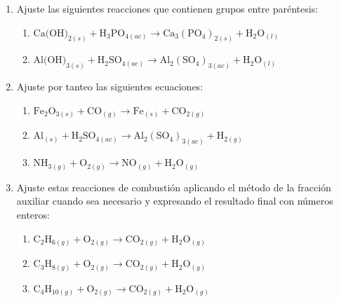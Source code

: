 \documentclass[12pt, letterpaper]{article}
\begin{document}
\begin{enumerate}[leftmargin=*, start=1]
  \item \medio{}\hspace{0.55em}Ajuste las siguientes reacciones que contienen grupos entre paréntesis:
        \begin{enumerate}[label=\alph*), leftmargin=1.8em, nosep, topsep=2pt]
          \item $\text{Ca(OH)}_{2(s)} + \text{H}_3\text{PO}_{4(ac)} \longrightarrow \text{Ca}_3(\text{PO}_4)_{2(s)} + \text{H}_2\text{O}_{(l)}$
          \item $\text{Al(OH)}_{3(s)} + \text{H}_2\text{SO}_{4(ac)} \longrightarrow \text{Al}_2(\text{SO}_4)_{3(ac)} + \text{H}_2\text{O}_{(l)}$
        \end{enumerate}

  \item \medio{}\hspace{0.55em}Ajuste por tanteo las siguientes ecuaciones:
        \begin{enumerate}[label=\alph*), leftmargin=1.8em, nosep, topsep=2pt]
          \item $\text{Fe}_2\text{O}_{3(s)} + \text{CO}_{(g)} \longrightarrow \text{Fe}_{(s)} + \text{CO}_{2(g)}$
          \item $\text{Al}_{(s)} + \text{H}_2\text{SO}_{4(ac)} \longrightarrow \text{Al}_2(\text{SO}_4)_{3(ac)} + \text{H}_{2(g)}$
          \item $\text{NH}_{3(g)} + \text{O}_{2(g)} \longrightarrow \text{NO}_{(g)} + \text{H}_2\text{O}_{(g)}$
        \end{enumerate}

  \item \medio{}\hspace{0.55em}Ajuste estas reacciones de combustión aplicando el método de la fracción auxiliar cuando sea necesario y expresando el resultado final con números enteros:
        \begin{enumerate}[label=\alph*), leftmargin=1.8em, nosep, topsep=2pt]
          \item $\text{C}_2\text{H}_{6(g)} + \text{O}_{2(g)} \longrightarrow \text{CO}_{2(g)} + \text{H}_2\text{O}_{(g)}$
          \item $\text{C}_3\text{H}_{8(g)} + \text{O}_{2(g)} \longrightarrow \text{CO}_{2(g)} + \text{H}_2\text{O}_{(g)}$
          \item $\text{C}_4\text{H}_{10(g)} + \text{O}_{2(g)} \longrightarrow \text{CO}_{2(g)} + \text{H}_2\text{O}_{(g)}$
        \end{enumerate}


\end{enumerate}
\end{document}
